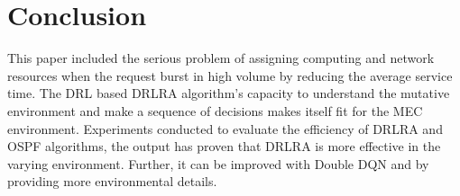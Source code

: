 \section{Conclusion}
\label{sec:Conclusion}
This paper included the serious problem of assigning computing and network resources when the request burst in high volume by reducing the average service time. The DRL based DRLRA algorithm's capacity to understand the mutative environment and make a sequence of decisions makes itself fit for the MEC environment. Experiments conducted to evaluate the efficiency of DRLRA and OSPF algorithms, the output has proven that DRLRA is more effective in the varying environment. Further, it can be improved with Double DQN \cite{Qrash:_DQN} and by providing more environmental details. 



